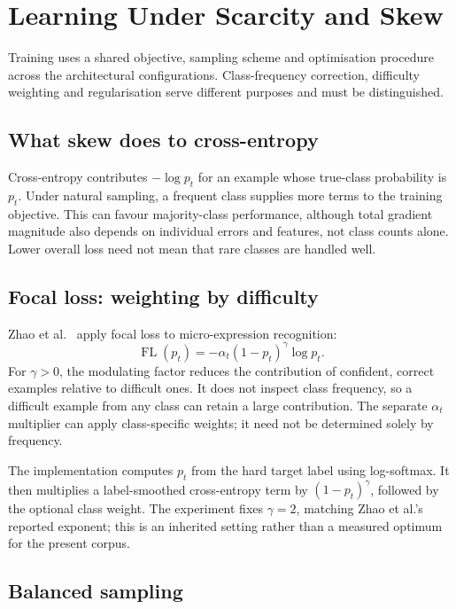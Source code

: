 \section{Learning Under Scarcity and Skew}
\label{sec:scarcity-skew}

Training uses a shared objective, sampling scheme and optimisation procedure across the architectural configurations. Class-frequency correction, difficulty weighting and regularisation serve different purposes and must be distinguished.

\subsection{What skew does to cross-entropy}
\label{sec:skew-cross-entropy}

Cross-entropy contributes $-\log p_t$ for an example whose true-class probability is $p_t$. Under natural sampling, a frequent class supplies more terms to the training objective. This can favour majority-class performance, although total gradient magnitude also depends on individual errors and features, not class counts alone. Lower overall loss need not mean that rare classes are handled well.

\subsection{Focal loss: weighting by difficulty}
\label{sec:focal-loss}

Zhao et al.~\cite{zhaoS2021} apply focal loss to micro-expression recognition:
\[
    \operatorname{FL}(p_t)=-\alpha_t(1-p_t)^\gamma\log p_t.
\]
For $\gamma>0$, the modulating factor reduces the contribution of confident, correct examples relative to difficult ones. It does not inspect class frequency, so a difficult example from any class can retain a large contribution. The separate $\alpha_t$ multiplier can apply class-specific weights; it need not be determined solely by frequency.

The implementation computes $p_t$ from the hard target label using log-softmax. It then multiplies a label-smoothed cross-entropy term by $(1-p_t)^\gamma$, followed by the optional class weight. The experiment fixes $\gamma=2$, matching Zhao et al.'s reported exponent; this is an inherited setting rather than a measured optimum for the present corpus.

\subsection{Balanced sampling}
\label{sec:balanced-sampling}

